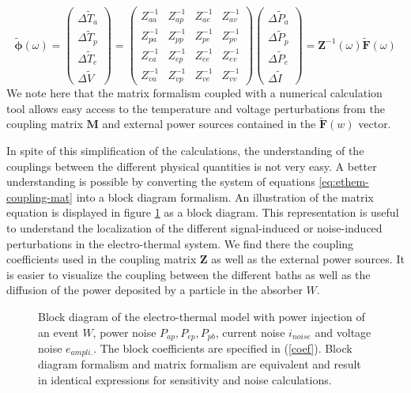 \begin{equation}
\bm{\tilde{\phi}} (\omega) =
\left( \begin{array}{c}
\Delta \tilde{T}_a\\
\Delta \tilde{T}_p\\
\Delta \tilde{T}_e\\
\Delta \tilde{V}
\end{array} \right)
=
\left( \begin{array}{cccc}
 Z_{aa}^{-1}&Z_{ap}^{-1}&Z_{ae}^{-1}&Z_{av}^{-1} \\
 Z_{pa}^{-1}&Z_{pp}^{-1}&Z_{pe}^{-1}&Z_{pv}^{-1}\\
 Z_{ea}^{-1}&Z_{ep}^{-1}&Z_{ee}^{-1}&Z_{ev}^{-1}\\
 Z_{va}^{-1}&Z_{vp}^{-1}&Z_{ve}^{-1}&Z_{vv}^{-1}
\end{array} \right)
\left( \begin{array}{c}
\Delta \tilde{P}_a\\
\Delta \tilde{P}_p\\
\Delta \tilde{P}_e\\
\Delta \tilde{I}
\end{array} \right)
= \bm{Z}^{-1}(\omega) \bm{\tilde{F}} (\omega)
\end{equation}
We note here that the matrix formalism coupled with a numerical calculation tool allows easy access to the temperature and voltage perturbations from the coupling matrix $\bm{M}$ and external power sources contained in the $\bm{\tilde{F}}(w)$ vector.

In spite of this simplification of the calculations, the understanding of the couplings between the different physical quantities is not very easy. A better understanding is possible by converting the system of equations \ref{eq:ethem-coupling-mat} into a block diagram formalism. 
An illustration of the matrix equation is displayed in figure \ref{fig:block-diagram} as a block diagram. This representation is useful to understand the localization of the different signal-induced or noise-induced perturbations in the electro-thermal system. We find there the coupling coefficients used in the coupling matrix $\bm{Z}$ as well as the external power sources. It is easier to visualize the coupling between the different baths as well as the diffusion of the power deposited by a particle in the absorber $W$.

\begin{figure}
\begin{center}
\resizebox{\textwidth}{!}{%
\begin{tikzpicture}
	
\end{tikzpicture}
}%
\end{center}
\caption{Block diagram of the electro-thermal model with power injection of an event $W$, power noise $P_{ap}, P_{ep}, P_{pb}$, current noise $i_{noise}$ and voltage noise $e_{ampli.}$. The block coefficients are specified in (\ref{coef}). Block diagram formalism and matrix formalism are equivalent and result in identical expressions for sensitivity and noise calculations.
}
\label{fig:block-diagram}
\end{figure}

